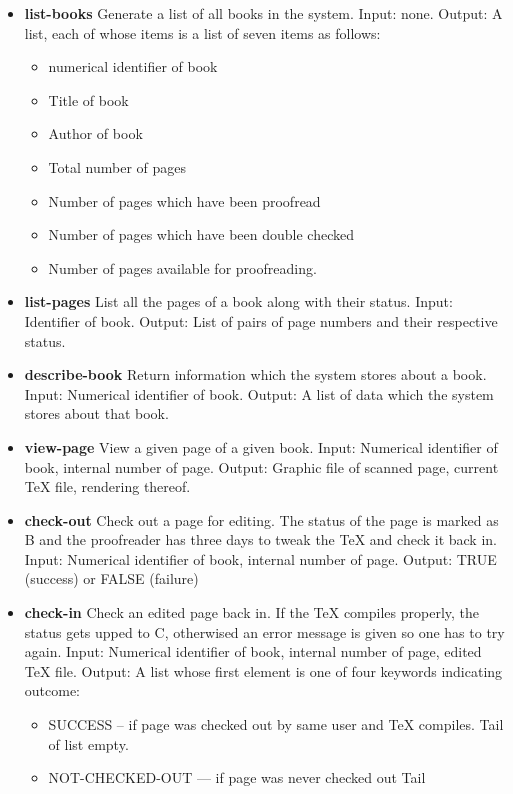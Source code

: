\begin{itemize}
\begin{itemize}
\item
  {\bf list-books}  Generate a list of all books in the system.  Input:
  none.  Output: A list, each of whose items is a list of seven items
  as follows:
  \begin{itemize}
  \item numerical identifier of book 
  \item Title of
    book 
  \item Author of book 
  \item Total number of pages 
  \item
    Number of pages which have been proofread 
  \item Number of pages
    which have been double checked 
  \item Number of pages available for
    proofreading.
  \end{itemize}
\item
  {\bf list-pages}  List all the pages of a book along with their status. 
  Input: Identifier of book.  Output: List of pairs of page numbers and
  their respective status.
\item
  {\bf describe-book}  Return information which the system stores about a
  book.  Input: Numerical identifier of book.  Output: A list of data
  which the system stores about that book.
\item
  {\bf view-page}  View a given page of a given book.  Input: Numerical
  identifier of book, internal number of page.  Output: Graphic file of
  scanned page, current TeX file, rendering thereof.
\item
  {\bf check-out}  Check out a page for editing. The status of the page is
  marked as B and the proofreader has three days to tweak the TeX and
  check it back in.\\  Input: Numerical identifier of book, internal
  number of page.  Output: TRUE (success) or FALSE (failure)
\item
  {\bf check-in}  Check an edited page back in. If the TeX compiles
  properly, the status gets upped to C, otherwised an error message is
  given so one has to try again.  Input: Numerical identifier of book,
  internal number of page, edited TeX file.  Output: A list whose first
  element is one of four keywords indicating outcome:
  \begin{itemize}
  \item SUCCESS
    -- if page was checked out by same user and TeX compiles. Tail of list
    empty. 
  \item NOT-CHECKED-OUT --- if page was never checked out Tail

\end{itemize}
\end{itemize}
\end{itemize}
